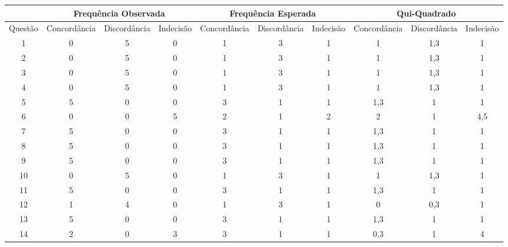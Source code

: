 				\begin{landscape}
				\begin{table}[h]
					\centering 
					\begin{tabular}{|c|c|c|c|c|c|c|c|c|c|}

						\hline
						& \multicolumn{3}{|c|}{\textbf{Frequência Observada}} & \multicolumn{3}{c|}{\textbf{Frequência Esperada}} & \multicolumn{3}{c|}{\textbf{Qui-Quadrado}} \\

						\hline

						Questão & Concordância & Discordância & Indecisão & Concordância & Discordância & Indecisão & Concordância & Discordância & Indecisão \\
						
						\hline
						
						1 & 0 & 5 & 0 & 1 & 3 & 1 & 1 & 1,3 & 1 \\
						
						2 & 0 & 5 & 0 & 1 & 3 & 1 & 1 & 1,3 & 1 \\
						
						3 & 0 & 5 & 0 & 1 & 3 & 1 & 1 & 1,3 & 1 \\

						4 & 0 & 5 & 0 & 1 & 3 & 1 & 1 & 1,3 & 1 \\

						5 & 5 & 0 & 0 & 3 & 1 & 1 & 1,3 & 1 & 1 \\

						6 & 0 & 0 & 5 & 2 & 1 & 2 & 2 & 1 & 4,5 \\

						7 & 5 & 0 & 0 & 3 & 1 & 1 & 1,3 & 1 & 1 \\

						8 & 5 & 0 & 0 & 3 & 1 & 1 & 1,3 & 1 & 1 \\

						9 & 5 & 0 & 0 & 3 & 1 & 1 & 1,3 & 1 & 1 \\

						10 & 0 & 5 & 0 & 1 & 3 & 1 & 1 & 1,3 & 1 \\

						11 & 5 & 0 & 0 & 3 & 1 & 1 & 1,3 & 1 & 1 \\

						12 & 1 & 4 & 0 & 1 & 3 & 1 & 0 & 0,3 & 1 \\

						13 & 5 & 0 & 0 & 3 & 1 & 1 & 1,3 & 1 & 1 \\

						14 & 2 & 0 & 3 & 3 & 1 & 1 & 0,3 & 1 & 4 \\


\end{tabular}
\end{table}
\end{landscape}
